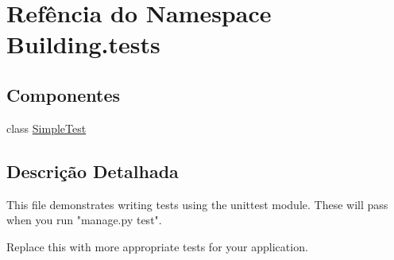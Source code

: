 \hypertarget{namespaceBuilding_1_1tests}{\section{Refência do Namespace Building.\-tests}
\label{namespaceBuilding_1_1tests}
}
\subsection*{Componentes}
\begin{DoxyCompactItemize}
\item 
class \hyperlink{classBuilding_1_1tests_1_1SimpleTest}{Simple\-Test}
\end{DoxyCompactItemize}


\subsection{Descrição Detalhada}
\begin{DoxyVerb}This file demonstrates writing tests using the unittest module. These will pass
when you run "manage.py test".

Replace this with more appropriate tests for your application.
\end{DoxyVerb}
 